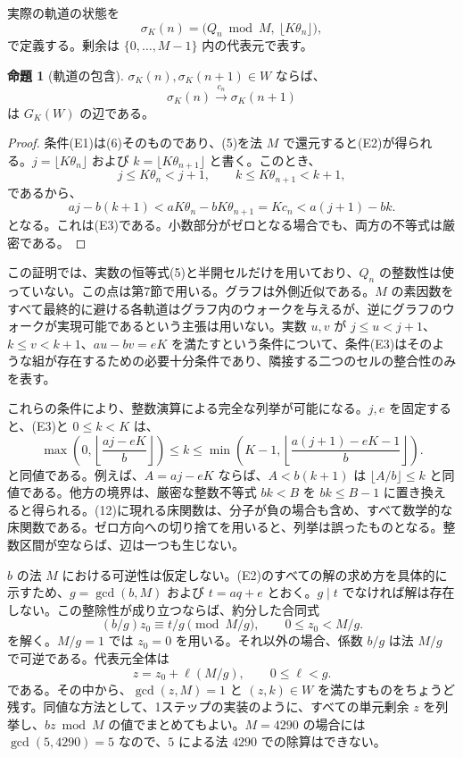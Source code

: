 \documentclass[11pt,reqno]{amsart}
\theoremstyle{definition}
\newtheorem{proposition}[theorem]{命題}
\theoremstyle{definition}
\theoremstyle{remark}
\begin{document}
実際の軌道の状態を
\[
\sigma_K(n)=\bigl(Q_n\bmod M,\ \lfloor K\theta_n\rfloor\bigr),
\tag{11}\label{eq:11}
\]
で定義する。剰余は \(\{0,\ldots,M-1\}\) 内の代表元で表す。

\begin{samepage}
\begin{proposition}[軌道の包含]\leavevmode\label{thm:5}
\(\sigma_K(n),\sigma_K(n+1)\in W\) ならば、
\[
\sigma_K(n)\xrightarrow{c_n}\sigma_K(n+1)
\]
は \(G_K(W)\) の辺である。
\label{thm-end:5}
\end{proposition}
\end{samepage}

\begin{proof}\leavevmode\label{proof:5}
条件(E1)は(6)そのものであり、(5)を法 \(M\) で還元すると(E2)が得られる。\(j=\lfloor K\theta_n\rfloor\) および \(k=\lfloor K\theta_{n+1}\rfloor\) と書く。このとき、
\[
j\le K\theta_n<j+1,\qquad k\le K\theta_{n+1}<k+1,
\]
であるから、
\[
aj-b(k+1)<aK\theta_n-bK\theta_{n+1}=Kc_n<a(j+1)-bk.
\]
となる。これは(E3)である。小数部分がゼロとなる場合でも、両方の不等式は厳密である。\qedhere
\end{proof}

この証明では、実数の恒等式(5)と半開セルだけを用いており、\(Q_n\) の整数性は使っていない。この点は第7節で用いる。グラフは外側近似である。\(M\) の素因数をすべて最終的に避ける各軌道はグラフ内のウォークを与えるが、逆にグラフのウォークが実現可能であるという主張は用いない。実数 \(u,v\) が \(j\le u<j+1\)、\(k\le v<k+1\)、\(au-bv=eK\) を満たすという条件について、条件(E3)はそのような組が存在するための必要十分条件であり、隣接する二つのセルの整合性のみを表す。

これらの条件により、整数演算による完全な列挙が可能になる。\(j,e\) を固定すると、(E3)と \(0\le k<K\) は、
\[
\max\!\left(0,\left\lfloor\frac{aj-eK}{b}\right\rfloor\right)
\le k\le
\min\!\left(K-1,\left\lfloor\frac{a(j+1)-eK-1}{b}\right\rfloor\right).
\tag{12}\label{eq:12}
\]
と同値である。例えば、\(A=aj-eK\) ならば、\(A<b(k+1)\) は \(\lfloor A/b\rfloor\le k\) と同値である。他方の境界は、厳密な整数不等式 \(bk<B\) を \(bk\le B-1\) に置き換えると得られる。(12)に現れる床関数は、分子が負の場合も含め、すべて数学的な床関数である。ゼロ方向への切り捨てを用いると、列挙は誤ったものとなる。整数区間が空ならば、辺は一つも生じない。

\(b\) の法 \(M\) における可逆性は仮定しない。(E2)のすべての解の求め方を具体的に示すため、\(g=\gcd(b,M)\) および \(t=aq+e\) とおく。\(g\mid t\) でなければ解は存在しない。この整除性が成り立つならば、約分した合同式
\[
(b/g)z_0\equiv t/g\pmod{M/g},\qquad 0\le z_0<M/g.
\]
を解く。\(M/g=1\) では \(z_0=0\) を用いる。それ以外の場合、係数 \(b/g\) は法 \(M/g\) で可逆である。代表元全体は
\[
z=z_0+\ell(M/g),\qquad 0\le\ell<g.
\tag{13}\label{eq:13}
\]
である。その中から、\(\gcd(z,M)=1\) と \((z,k)\in W\) を満たすものをちょうど残す。同値な方法として、1ステップの実装のように、すべての単元剰余 \(z\) を列挙し、\(bz\bmod M\) の値でまとめてもよい。\(M=4290\) の場合には \(\gcd(5,4290)=5\) なので、\(5\) による法 \(4290\) での除算はできない。
\end{document}
